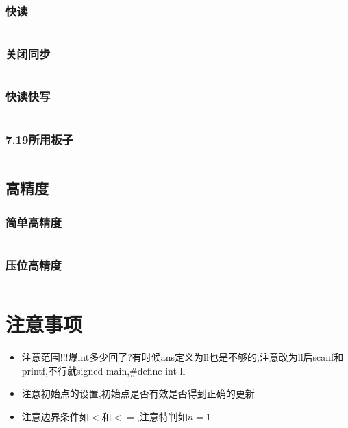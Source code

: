 \documentclass[a4paper,11pt]{article}
\begin{document}
\subsubsection{快读}
\inputminted[breaklines,linenos,frame=leftline]{c++}{others/read1.cpp}
\subsubsection{关闭同步}
\inputminted[breaklines,linenos,frame=leftline]{c++}{others/read2.cpp}
\subsubsection{快读快写}
\inputminted[breaklines,linenos,frame=leftline]{c++}{others/read3.cpp}
\subsubsection{7.19所用板子}
\inputminted[breaklines,linenos,frame=leftline]{c++}{others/7.19.cpp}
\subsection{高精度}
\subsubsection{简单高精度}
\inputminted[breaklines,linenos,frame=leftline]{c++}{others/bignum2.cpp}
\subsubsection{压位高精度}
\inputminted[breaklines,linenos,frame=leftline]{c++}{others/bignum1.cpp}

\newpage
\section{注意事项}
\begin{itemize}
    \item 注意范围!!!爆int多少回了?有时候ans定义为ll也是不够的,注意改为ll后scanf和printf,不行就signed main,\#define int ll
    \item 注意初始点的设置,初始点是否有效是否得到正确的更新
    \item 注意边界条件如$<$和$<=$,注意特判如$n=1$
\end{itemize}
\end{document}
